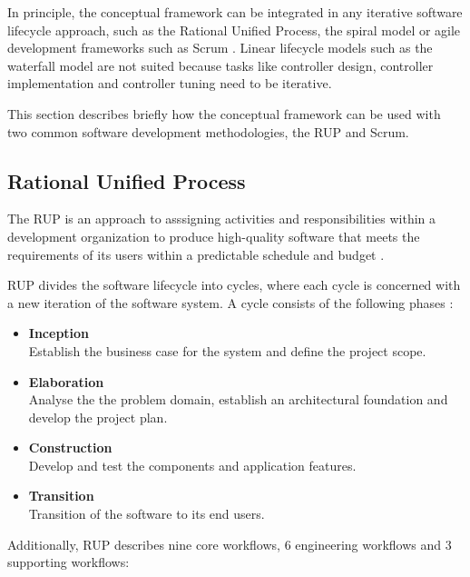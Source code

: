 In principle, the conceptual framework can be integrated in any iterative software lifecycle approach, such as the Rational Unified Process, the spiral model \citep{Boehm:1988cd} or agile development frameworks such as Scrum \citep{Schwaber:2013aa}. Linear lifecycle models such as the waterfall model \citep{Royce:1987tl} are not suited because tasks like controller design, controller implementation and controller tuning need to be iterative.

This section describes briefly how the conceptual framework can be used with two common software development methodologies, the \ac{RUP} and Scrum.

\subsection{Rational Unified Process}
The \acf{RUP} is an approach to asssigning activities and responsibilities within a development organization to produce high-quality software that meets the requirements of its users within a predictable schedule and budget \citep{Rational:2001aa}.

\ac{RUP} divides the software lifecycle into cycles, where each cycle is concerned with a new iteration of the software system. A cycle consists of the following phases \citep{Kruchten:1996aa}:

\begin{itemize}
	\item \textbf{Inception}\\
	Establish the business case for the system and define the project scope.
	\item \textbf{Elaboration}\\
	Analyse the the problem domain, establish an architectural foundation and develop the project plan.
	\item \textbf{Construction}\\
	Develop and test the components and application features.
	\item \textbf{Transition}\\
	Transition of the software to its end users.
\end{itemize}

Additionally, \ac{RUP} describes nine core workflows, 6 engineering workflows and 3 supporting workflows:

